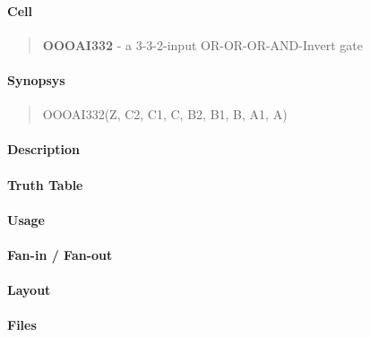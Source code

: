 \label{OOOAI332}
\paragraph{Cell}
\begin{quote}
    \textbf{OOOAI332} - a 3-3-2-input OR-OR-OR-AND-Invert gate
\end{quote}

\paragraph{Synopsys}
\begin{quote}
    OOOAI332(Z, C2, C1, C, B2, B1, B, A1, A)
\end{quote}

\paragraph{Description}



\paragraph{Truth Table}


\paragraph{Usage}

\paragraph{Fan-in / Fan-out}

\paragraph{Layout}

\paragraph{Files}
